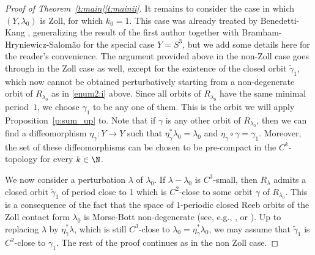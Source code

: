 \begin{proof}[Proof of Theorem~\ref{t:main}\eqref{t:mainii}]
It remains to consider the case in which $(Y,\lambda_0)$ is Zoll, for which $k_0=1$. This case was already treated by Benedetti-Kang \cite{Benedetti:2021aa}, generalizing the result of the first author together with Bramham-Hryniewicz-Salom\~ao \cite{Abbondandolo:2018fb} for the special case $Y=S^3$, but we add some details here for the reader's convenience. The argument provided above in the non-Zoll case goes through in the Zoll case as well, except for the existence of the closed orbit $\tilde\gamma_1$, which now cannot be obtained perturbatively starting from a non-degenerate orbit of $R_{\lambda_0}$ as in \eqref{enum2:i} above. Since all orbits of $R_{\lambda_0}$ have the same minimal period~$1$, we choose $\gamma_1$ to be any one of them. This is the orbit we will apply Proposition~\ref{p:sum_up} to. Note that if $\gamma$ is any other orbit of $R_{\lambda_0}$, then we can find a diffeomorphism $\eta_\gamma: Y \to Y$ such that $\eta_{\gamma}^* \lambda_0 = \lambda_0$ and $\eta_{\gamma}\circ \gamma = \gamma_1$. Moreover, the set of these diffeomorphisms can be chosen to be pre-compact in the $C^k$-topology for every $k\in \N$.

We now consider a perturbation $\lambda$ of $\lambda_0$. If $\lambda-\lambda_0$ is $C^3$-small, then $R_{\lambda}$ admits a closed orbit $\tilde{\gamma}_1$ of period close to 1 which is $C^2$-close to some orbit $\gamma$ of $R_{\lambda_0}$.
This is a consequence of the fact that the space of $1$-periodic closed Reeb orbits of the Zoll contact form $\lambda_0$ is Morse-Bott non-degenerate (see, e.g., \cite{Weinstein:1973}, \cite{Bottkol:1980} or \cite{Ginzburg:1987lq}). Up to replacing $\lambda$ by $\eta_{\gamma}^* \lambda$, which is still $C^3$-close to $\lambda_0=\eta_{\gamma}^* \lambda_0$, we may assume that $\tilde{\gamma}_1$ is $C^2$-close to $\gamma_1$. The rest of the proof continues as in the non Zoll case.
\end{proof}

